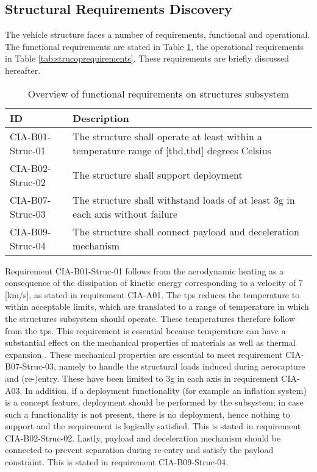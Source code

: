 \subsection{Structural Requirements Discovery} \label{sec:struct}
The vehicle structure faces a number of requirements, functional and operational. The functional requirements are stated in Table \ref{tab:strucfuncrequirements}, the operational requirements in Table \ref{tab:strucoprequirements}. These requirements are briefly discussed hereafter.
\begin{table}[H]
	\caption{Overview of functional requirements on structures subsystem}
	\begin{tabular}{|p{}|p{}|}
    \hline
    ID          & Description                                                                                                      \\ \hline \hline
    CIA-B01-Struc-01 & The structure shall operate at least within a temperature range of [\gls{tbd},\gls{tbd}] degrees Celsius           \\ \hline
    CIA-B02-Struc-02 & The structure shall support deployment \\ \hline
    CIA-B07-Struc-03 & The structure shall withstand loads of at least 3g in each axis without failure                           \\ \hline
    CIA-B09-Struc-04 & The structure shall connect payload and deceleration mechanism \\ \hline
    \end{tabular}
    \label{tab:strucfuncrequirements}
\end{table}
Requirement CIA-B01-Struc-01 follows from the aerodynamic heating as a consequence of the dissipation of kinetic energy corresponding to a velocity of 7 [km/s], as stated in requirement CIA-A01. The \gls{tps} reduces the temperature to within acceptable limits, which are translated to a range of temperature in which the structures subsystem should operate. These temperatures therefore follow from the \gls{tps}. This requirement is essential because temperature can have a substantial effect on the mechanical properties of materials as well as thermal expansion \cite{Callister2007}. These mechanical properties are essential to meet requirement CIA-B07-Struc-03, namely to handle the structural loads induced during aerocapture and (re-)entry. These have been limited to 3g in each axis in requirement CIA-A03. In addition, if a deployment functionality  (for example an inflation system) is a concept feature, deployment should be performed by the subsystem; in case such a functionality is not present, there is no deployment, hence nothing to support and the requirement is logically satisfied. This is stated in requirement CIA-B02-Struc-02. Lastly, payload and deceleration mechanism should be connected to prevent separation during re-entry and satisfy the payload constraint. This is stated in requirement CIA-B09-Struc-04.

